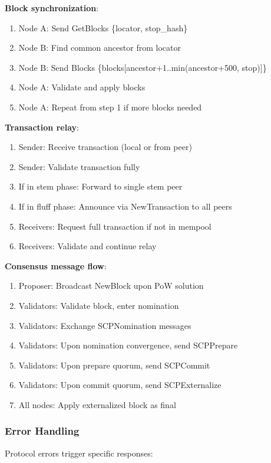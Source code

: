 \textbf{Block synchronization}:
\begin{enumerate}
  \item Node A: Send GetBlocks \{locator, stop\_hash\}
  \item Node B: Find common ancestor from locator
  \item Node B: Send Blocks \{blocks[ancestor+1..min(ancestor+500, stop)]\}
  \item Node A: Validate and apply blocks
  \item Node A: Repeat from step 1 if more blocks needed
\end{enumerate}

\textbf{Transaction relay}:
\begin{enumerate}
  \item Sender: Receive transaction (local or from peer)
  \item Sender: Validate transaction fully
  \item If in stem phase: Forward to single stem peer
  \item If in fluff phase: Announce via NewTransaction to all peers
  \item Receivers: Request full transaction if not in mempool
  \item Receivers: Validate and continue relay
\end{enumerate}

\textbf{Consensus message flow}:
\begin{enumerate}
  \item Proposer: Broadcast NewBlock upon PoW solution
  \item Validators: Validate block, enter nomination
  \item Validators: Exchange SCPNomination messages
  \item Validators: Upon nomination convergence, send SCPPrepare
  \item Validators: Upon prepare quorum, send SCPCommit
  \item Validators: Upon commit quorum, send SCPExternalize
  \item All nodes: Apply externalized block as final
\end{enumerate}

\subsubsection{Error Handling}

Protocol errors trigger specific responses:

